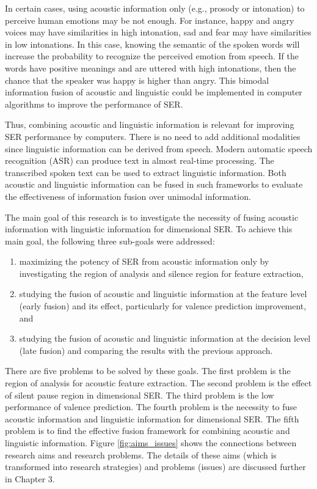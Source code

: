 In certain cases, using acoustic information only (e.g., prosody or intonation)
to perceive human emotions may be not enough. For instance, happy and angry
voices may have similarities in high intonation, sad and fear may have
similarities in low intonations. In this case, knowing the semantic of the
spoken words will increase the probability to recognize the perceived emotion
from speech. If the words have positive meanings and are uttered with high
intonations, then the chance that the speaker was happy is higher than angry.
This bimodal information fusion of acoustic and linguistic could be implemented
in computer algorithms to improve the performance of SER.

Thus, combining acoustic and linguistic information is relevant for improving
SER performance by computers. There is no need to add additional modalities
since linguistic information can be derived from speech. Modern automatic
speech recognition (ASR) can produce text in almost real-time processing. The
transcribed spoken text can be used to extract linguistic information. Both
acoustic and linguistic information can be fused in such frameworks to evaluate
the effectiveness of information fusion over unimodal information.

The main goal of this research is to investigate the necessity of fusing
acoustic information with linguistic information for dimensional SER. To
achieve this main goal, the following three sub-goals were addressed: 
\begin{enumerate}
\item maximizing the potency of SER from acoustic information only by
investigating the region of analysis and silence region for feature extraction,
\item studying the fusion of acoustic and linguistic information at the feature
level (early fusion) and its effect, particularly for valence prediction
improvement, and 
\item studying the fusion of acoustic and linguistic information at the decision
level (late fusion) and comparing the results with the previous approach.  
\end{enumerate}

There are five problems to be solved by these goals. The first problem is the
region of analysis for acoustic feature extraction. The second problem is the
effect of silent pause region in dimensional SER. The third problem is the low
performance of valence prediction. The fourth problem is the necessity to fuse
acoustic information and linguistic information for dimensional SER. The fifth
problem is to find the effective fusion framework for combining acoustic and
linguistic information. Figure \ref{fig:aims_issues} shows the connections
between research aims and research problems. The details of these aims (which
is transformed into research strategies) and problems (issues) are discussed
further in Chapter 3. 

